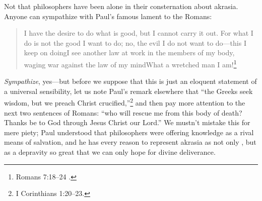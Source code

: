 \documentclass[11pt,letterpaper,oneside]{amsart}
\begin{document}





Not that philosophers have been alone in their consternation about akrasia. Anyone can sympathize with Paul's famous lament to the Romans:\begin{quote}I have the desire to do what is good, but I cannot carry it out. For what I do is not the good I want to do; no, the evil I do not want to do---this I keep on doing\sdots I see another law at work in the members of my body, waging war against the law of my mind\sdots What a wretched man I am!\footnote{Romans 7:18--24 .}\end{quote} \emph{Sympathize}, yes---but before we suppose that this is just an eloquent statement of a universal sensibility, let us note Paul's remark elsewhere that ``the Greeks seek wisdom, but we preach Christ crucified,''\footnote{I Corinthians 1:20--23.} and then pay more attention to the next two sentences of Romans: ``who will rescue me from this body of death? Thanks be to God through Jesus Christ our Lord.'' We mustn't mistake this for mere piety; Paul understood that philosophers were offering knowledge as a rival means of salvation, and he has every reason to represent akrasia as not only , but as a depravity so great that we can only hope for divine deliverance. %











\end{document}
